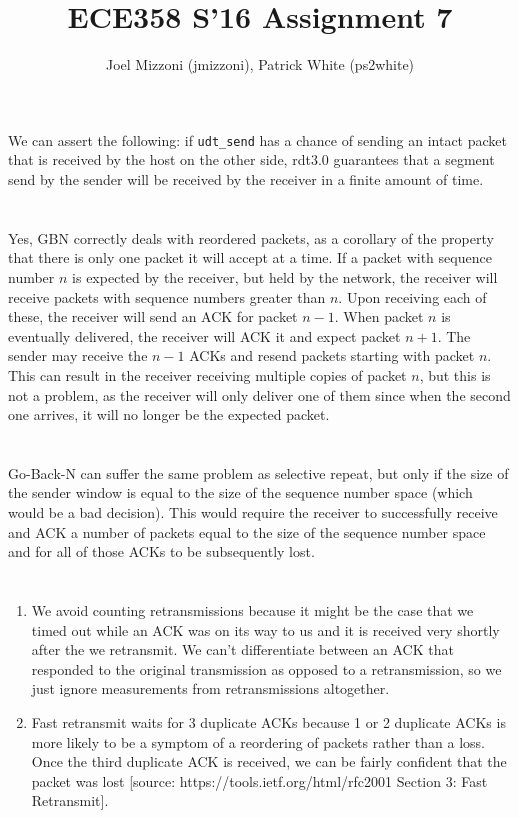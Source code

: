\documentclass[10pt,a4paper]{article}
\author{Joel Mizzoni (jmizzoni), Patrick White (ps2white)}
\begin{document}
\title{ECE358 S'16 Assignment 7}
\maketitle
\section{}
We can assert the following: if \texttt{udt\_send} has a chance of sending an intact packet that is received by the host on the other side, rdt3.0 guarantees that a segment send by the sender will be received by the receiver in a finite amount of time.
\section{}
Yes, GBN correctly deals with reordered packets, as a corollary of the property that there is only one packet it will accept at a time.
If a packet with sequence number $n$ is expected by the receiver, but held by the network, the receiver will receive packets with sequence numbers greater than $n$.
Upon receiving each of these, the receiver will send an ACK for packet $n-1$.
When packet $n$ is eventually delivered, the receiver will ACK it and expect packet $n+1$.
The sender may receive the $n-1$ ACKs and resend packets starting with packet $n$.
This can result in the receiver receiving multiple copies of packet $n$, but this is not a problem, as the receiver will only deliver one of them since when the second one arrives, it will no longer be the expected packet.
\section{}
Go-Back-N can suffer the same problem as selective repeat, but only if the size of the sender window is equal to the size of the sequence number space (which would be a bad decision). This would require the receiver to successfully receive and ACK a number of packets equal to the size of the sequence number space and for all of those ACKs to be subsequently lost.

\section{}

\begin{enumerate}[label=\alph*)]
    \item
        We avoid counting retransmissions because it might be the case that we timed out while an ACK was on its way to us and it is received very shortly after the we retransmit. We can't differentiate between an ACK that responded to the original transmission as opposed to a retransmission, so we just ignore measurements from retransmissions altogether.
    \item
        Fast retransmit waits for 3 duplicate ACKs because 1 or 2 duplicate ACKs is more likely to be a symptom of a reordering of packets rather than a loss. Once the third duplicate ACK is received, we can be fairly confident that the packet was lost [source: https://tools.ietf.org/html/rfc2001 Section 3: Fast Retransmit].
\end{enumerate}
\end{document}
